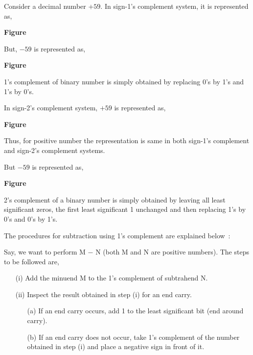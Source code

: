 Consider a decimal number $+59$. In sign-1's complement system, it is represented as,
\begin{center}
{\bf Figure}
\end{center}

But, $-59$ is represented as,
\begin{center}
{\bf Figure}
\end{center}

\begin{note}
1's complement of binary number is simply obtained by replacing 0's by 1's and 1's by 0's.
\end{note}

In sign-2's complement system, $+59$ is represented as,
\begin{center}
{\bf Figure}
\end{center}

Thus, for positive number the representation is same in both sign-1's complement and sign-2's complement systems.

But $-59$ is represented as,
\begin{center}
{\bf Figure}
\end{center}

\begin{note}
2's complement of a binary number is simply obtained by leaving all least significant zeros, the first least significant 1 unchanged and then replacing 1's by 0's and 0's by 1's.
\end{note}


The procedures for subtraction using 1's complement are explained below~:

Say, we want to perform M $-$ N (both M and N are positive numbers). The steps to be followed are,
\begin{itemize}
\item[(i)] Add the minuend M to the 1's complement of subtrahend N.

\item[(ii)] Inspect the result obtained in step (i) for an end carry.
\begin{itemize}
\item[(a)] If an end carry occurs, add 1 to the least significant bit (end around carry).

\item[(b)] If an end carry does not occur, take 1's complement of the number obtained in step (i) and place a negative sign in front of it.
\end{itemize}
\end{itemize}

